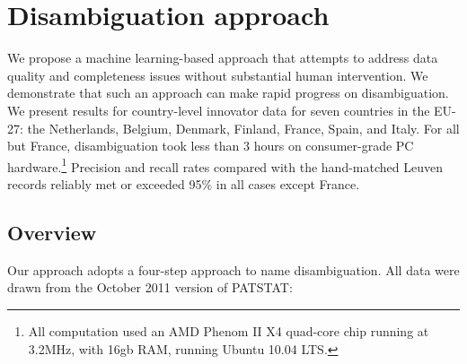 \documentclass[11pt]{article}
\begin{document}

\section{Disambiguation approach}
\label{sec:disamb-appr}

We propose a machine learning-based approach that attempts to address
data quality and completeness issues without substantial human
intervention. We demonstrate that such an approach can make rapid
progress on disambiguation. We present results for country-level
innovator data for seven countries in the EU-27: the Netherlands,
Belgium, Denmark, Finland, France, Spain, and Italy. For all but
France, disambiguation took less than 3 hours on consumer-grade PC
hardware.\footnote{All computation used an AMD Phenom II X4 quad-core
chip running at 3.2MHz, with 16gb RAM, running Ubuntu 10.04 LTS.}
Precision and recall rates compared with the hand-matched Leuven
records reliably met or exceeded 95\% in all cases except France.

\subsection{Overview}
\label{sec:overview}

Our approach adopts a four-step approach to name disambiguation. All
data were drawn from the October 2011 version of PATSTAT:
\end{document}
